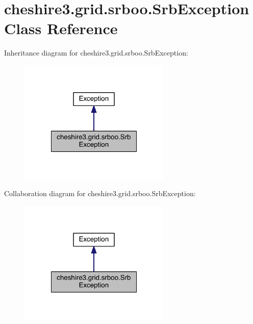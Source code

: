 \hypertarget{classcheshire3_1_1grid_1_1srboo_1_1_srb_exception}{\section{cheshire3.\-grid.\-srboo.\-Srb\-Exception Class Reference}
\label{classcheshire3_1_1grid_1_1srboo_1_1_srb_exception}
}


Inheritance diagram for cheshire3.\-grid.\-srboo.\-Srb\-Exception\-:
\nopagebreak
\begin{figure}[H]
\begin{center}
\leavevmode
\includegraphics[width=204pt]{classcheshire3_1_1grid_1_1srboo_1_1_srb_exception__inherit__graph}
\end{center}
\end{figure}


Collaboration diagram for cheshire3.\-grid.\-srboo.\-Srb\-Exception\-:
\nopagebreak
\begin{figure}[H]
\begin{center}
\leavevmode
\includegraphics[width=204pt]{classcheshire3_1_1grid_1_1srboo_1_1_srb_exception__coll__graph}
\end{center}
\end{figure}

